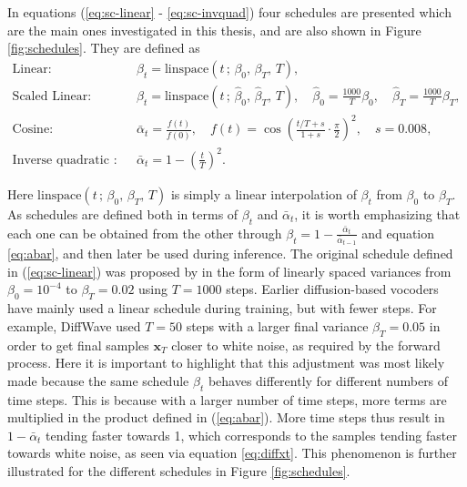 \documentclass{report}
\begin{document}
In equations (\ref{eq:sc-linear} - \ref{eq:sc-invquad}) four schedules are presented which are the main ones investigated in this thesis, and are also shown in Figure \ref{fig:schedules}. They are defined as
\begin{align} 
    \text{Linear}: & \quad \beta_t = \text{linspace}(t \, ; \, \beta_0, \, \beta_T, \, T), \label{eq:sc-linear} \\
    \text{Scaled Linear}: & \quad \beta_t = \text{linspace}(t \, ; \, \hat{\beta}_0, \, \hat{\beta}_T, \, T), \quad \hat{\beta}_0 = \frac{1000}{T} \beta_0, \quad \hat{\beta}_T = \frac{1000}{T}\beta_T, \label{eq:sc-scaled} \\
    \text{Cosine}: & \quad \bar{\alpha}_t = \frac{f(t)}{f(0)}, \quad f(t) = \cos\left( \frac{t/T + s}{ 1+ s}\cdot \frac{\pi}{2} \right)^2, \quad s = 0.008, \label{eq:sc-cos} \\
    \text{Inverse quadratic (IQ)}: & \quad \bar{\alpha}_t = 1 - \left(\frac{t}{T}\right)^2. \label{eq:sc-invquad}
\end{align}

Here $\text{linspace}(t \, ; \, \beta_0, \, \beta_T, \, T)$ is simply a linear interpolation of $\beta_t$ from $\beta_0$ to $\beta_T$. As schedules are defined both in terms of $\beta_t$ and $\bar{\alpha}_t$, it is worth emphasizing that each one can be obtained from the other through $\beta_t = 1 - \frac{\bar{\alpha}_t}{\bar{\alpha}_{t-1}}$ and equation \ref{eq:abar}, and then later be used during inference. The original schedule defined in (\ref{eq:sc-linear}) was proposed by \cite{ho2020denoising} in the form of linearly spaced variances from $\beta_0 = 10^{-4}$ to $\beta_T=0.02$ using $T=1000$ steps. Earlier diffusion-based vocoders have mainly used a linear schedule during training, but with fewer steps. For example, DiffWave used $T=50$ steps with a larger final variance $\beta_T=0.05$ in order to get final samples $\bm{x}_T$ closer to white noise, as required by the forward process. Here it is important to highlight that this adjustment was most likely made because the same schedule $\beta_t$ behaves differently for different numbers of time steps. This is because with a larger number of time steps, more terms are multiplied in the product defined in (\ref{eq:abar}). More time steps thus result in $1-\bar{\alpha}_t$ tending faster towards 1, which corresponds to the samples tending faster towards white noise, as seen via equation \ref{eq:diffxt}. This phenomenon is further illustrated for the different schedules in Figure \ref{fig:schedules}.
\end{document}
